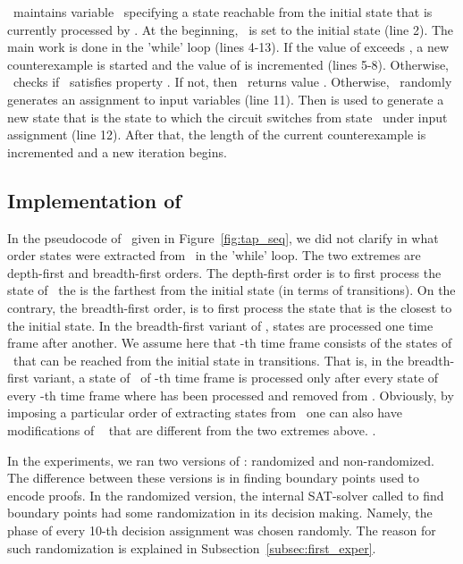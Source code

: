 \Rnd~maintains variable \Curr~specifying a state reachable from the initial state
that is  currently processed by \Rnd. At the beginning, \Curr~is set to the initial state (line 2).
The main work is done in the 'while' loop (lines 4-13). If the value of  
exceeds , a new counterexample is started  and the value
of  is incremented (lines 5-8). Otherwise, \Rnd~checks if \Curr~satisfies property .
If not, then  \Rnd~returns value .
Otherwise, \Rnd~randomly generates an assignment
 to input variables  (line 11). Then  is used to generate a new state
that is the state to which the circuit switches from state \Curr~under input assignment 
(line 12). After that, the length of the current counterexample is incremented and a new iteration begins.
\subsection{Implementation of \TS}
\label{subsec:impl_tap_seq}
In the pseudocode of \TS~given in Figure~\ref{fig:tap_seq}, we did not clarify in what order states were extracted
from \Acts~in the 'while' loop. The two extremes are  depth-first and breadth-first orders. The depth-first order is to
 first process the state of \Acts~the is the farthest
from the initial state (in terms of transitions).  On the contrary, the breadth-first order, is to first process the state that is the
closest to the initial state. In the breadth-first variant of \TS, states are processed  one time frame after another. We assume here
that -th time frame consists of the states of \All~that can be reached from the initial state in  transitions.
That is, in the breadth-first variant, a state of \Acts~of -th time frame is processed only after every state
of every -th time frame where  has been processed and removed from \Acts.
Obviously, by imposing a particular order of extracting states from \Acts~one can also have modifications of \TS~ that are different
from the two extremes above. .


In the experiments, we ran two versions of \TS: randomized and non-randomized. The difference between these versions is in finding
boundary points used to encode proofs. In the randomized version, the internal SAT-solver called  to find boundary points
had some randomization in its decision making. Namely, the phase of every 10-th decision assignment was chosen randomly. 
The reason for such randomization is explained in Subsection~\ref{subsec:first_exper}.
